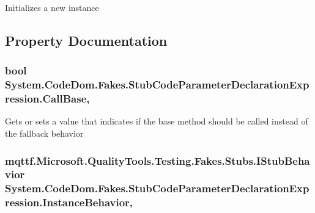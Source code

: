 Initializes a new instance



\subsection{Property Documentation}
\hypertarget{class_system_1_1_code_dom_1_1_fakes_1_1_stub_code_parameter_declaration_expression_a8f04d673de627a35c4c13c5c19974981}{
\subsubsection[{Call\-Base}]{\setlength{\rightskip}{0pt plus 5cm}bool System.\-Code\-Dom.\-Fakes.\-Stub\-Code\-Parameter\-Declaration\-Expression.\-Call\-Base\hspace{0.3cm}{\ttfamily [get]}, {\ttfamily [set]}}}\label{class_system_1_1_code_dom_1_1_fakes_1_1_stub_code_parameter_declaration_expression_a8f04d673de627a35c4c13c5c19974981}


Gets or sets a value that indicates if the base method should be called instead of the fallback behavior

\hypertarget{class_system_1_1_code_dom_1_1_fakes_1_1_stub_code_parameter_declaration_expression_a5112db7d7cf95dc5296258a12bbb78d5}{
\subsubsection[{Instance\-Behavior}]{\setlength{\rightskip}{0pt plus 5cm}mqttf.\-Microsoft.\-Quality\-Tools.\-Testing.\-Fakes.\-Stubs.\-I\-Stub\-Behavior System.\-Code\-Dom.\-Fakes.\-Stub\-Code\-Parameter\-Declaration\-Expression.\-Instance\-Behavior\hspace{0.3cm}{\ttfamily [get]}, {\ttfamily [set]}}}\label{class_system_1_1_code_dom_1_1_fakes_1_1_stub_code_parameter_declaration_expression_a5112db7d7cf95dc5296258a12bbb78d5}


